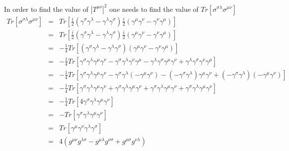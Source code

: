 \documentclass[12pt]{article}
\def \bea{\begin{eqnarray}}
\def \eea{\end{eqnarray}}
\def \nn{\nonumber}
\def \nl{\nn \\}
\def \ga{\gamma}
\def \la{\lambda}
\def \si{\sigma}
\begin{document}
\begin{enumerate}
In order to find the value of $|T^{\mu\nu}|^2$ one needs to find the value of $Tr[\si^{\si\la}\si^{\mu\nu}]$\\
\bea
Tr[\si^{\si\la}\si^{\mu\nu}]&=& Tr[\frac{i}{2}(\ga^\si\ga^\la - \ga^\la\ga^\si)\frac{i}{2}(\ga^\mu\ga^\nu - \ga^\nu\ga^\mu)]\\
&=& Tr[\frac{i}{2}(\ga^\si\ga^\la - \ga^\la\ga^\si)\frac{i}{2}(\ga^\mu\ga^\nu - \ga^\nu\ga^\mu)]\\
&=& -\frac{1}{4}Tr[(\ga^\si\ga^\la - \ga^\la\ga^\si)(\ga^\mu\ga^\nu - \ga^\nu\ga^\mu)]\\
&=& -\frac{1}{4}Tr[\ga^\si\ga^\la\ga^\mu\ga^\nu -\ga^\si\ga^\la\ga^\nu\ga^\mu- \ga^\la\ga^\si\ga^\mu\ga^\nu + \ga^\la\ga^\si\ga^\nu\ga^\mu]\\
&=& -\frac{1}{4}Tr[\ga^\si\ga^\la\ga^\mu\ga^\nu -\ga^\si\ga^\la(-\ga^\mu\ga^\nu)- (-\ga^\si\ga^\la)\ga^\mu\ga^\nu + (-\ga^\si\ga^\la)(-\ga^\mu\ga^\nu)]\nl
&=& -\frac{1}{4}Tr[\ga^\si\ga^\la\ga^\mu\ga^\nu +\ga^\si\ga^\la\ga^\mu\ga^\nu+\ga^\si\ga^\la\ga^\mu\ga^\nu +\ga^\si\ga^\la\ga^\mu\ga^\nu]\\
&=& -\frac{1}{4}Tr[4\ga^\si\ga^\la\ga^\mu\ga^\nu]\\
&=& -Tr[\ga^\si\ga^\la\ga^\mu\ga^\nu]\\
&=& Tr[\ga^\mu\ga^\nu\ga^\la\ga^\si]\\
&=& 4(g^{\mu\nu}g^{\la\si}- g^{\mu\la}g^{\nu\si}+g^{\mu\si}g^{\nu\la})\\
\eea


\end{enumerate}
\end{document}
